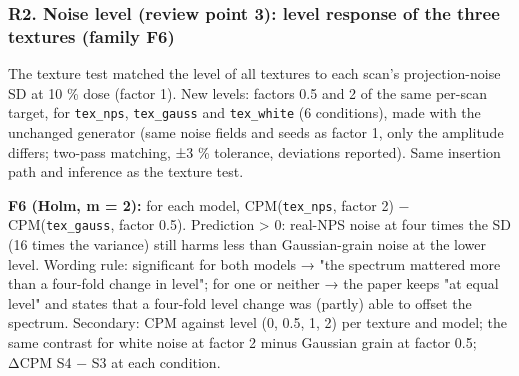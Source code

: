 \subsubsection*{R2. Noise level (review point 3): level response of the three textures (family F6)}
The texture test matched the level of all textures to each scan's projection-noise SD at 10 \% dose (factor 1). New levels: factors 0.5 and 2 of the same per-scan target, for \texttt{tex\_nps}, \texttt{tex\_gauss} and \texttt{tex\_white} (6 conditions), made with the unchanged generator (same noise fields and seeds as factor 1, only the amplitude differs; two-pass matching, ±3 \% tolerance, deviations reported). Same insertion path and inference as the texture test.

\textbf{F6 (Holm, m = 2):} for each model, CPM(\texttt{tex\_nps}, factor 2) − CPM(\texttt{tex\_gauss}, factor 0.5). Prediction \textgreater{} 0: real-NPS noise at four times the SD (16 times the variance) still harms less than Gaussian-grain noise at the lower level. Wording rule: significant for both models → "the spectrum mattered more than a four-fold change in level"; for one or neither → the paper keeps "at equal level" and states that a four-fold level change was (partly) able to offset the spectrum. Secondary: CPM against level (0, 0.5, 1, 2) per texture and model; the same contrast for white noise at factor 2 minus Gaussian grain at factor 0.5; ΔCPM S4 − S3 at each condition.

